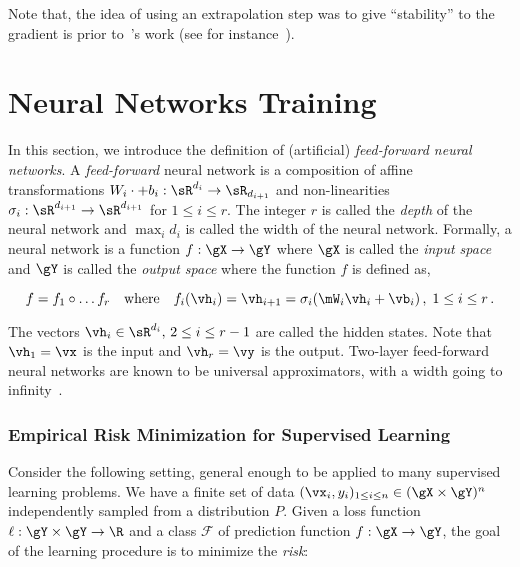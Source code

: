 Note that, the idea of using an extrapolation step was to give ``stability'' to the gradient is prior to~\citet{korpelevich1976extragradient}'s work (see for instance~\citet[Chap. II]{polyak1963gradient}).




\section{Neural Networks Training}

In this section, we introduce the definition of (artificial) \emph{feed-forward neural networks}. A \emph{feed-forward} neural network is a composition of affine transformations $W_i \cdot + b_i: \sR^{d_i} \to \sR_{d_{i+1}}$ and non-linearities $\sigma_i : \sR^{d_{i+1}} \to \sR^{d_{i+1}}$ for $1\leq i \leq r$. The integer $r$ is called the \emph{depth} of the neural network and $\max_i d_i$ is called the width of the neural network. Formally, a neural network is a function $f: \gX \to \gY$ where $\gX$ is called the \emph{input space} and $\gY$ is called the \emph{output space} where the function $f$ is defined as,

\begin{equation}
f = f_1 \circ \ldots f_r \quad \text{where} \quad f_i (\vh_i) = \vh_{i+1} = \sigma_i( \mW_i \vh_i + \vb_i) \, , \; 1\leq i \leq r \,. 
\end{equation}

The vectors $\vh_i \in \sR^{d_i}, \, 2 \leq i \leq r-1$ are called the hidden states. Note that $\vh_1= \vx$ is the input and $\vh_r = \vy$ is the output. Two-layer feed-forward neural networks are known to be universal approximators, with a width going to infinity~\citep{hornik1989multilayer}. 





\subsubsection{Empirical Risk Minimization for Supervised Learning}

Consider the following setting, general enough to be applied to many supervised learning problems. We have a finite set of data $(\vx_i,y_i)_{1\leq i\leq n} \in (\gX\times \gY)^n$ independently sampled from a distribution $P$. Given a loss function $\ell: \gY \times \gY \to \R$ and a class $\mathcal F$ of prediction function $f: \gX \to \gY$, the goal of the learning procedure is to minimize the \emph{risk}:

